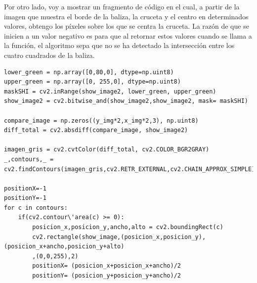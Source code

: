 \hspace{1cm} Por otro lado, voy a mostrar un fragmento de c\'odigo en el cual, a partir de la imagen que muestra el borde de la baliza, la cruceta y el centro en determinados valores, obtengo los p\'ixeles sobre los que se centra la cruceta. La raz\'on de que se inicien a un valor negativo es para que al retornar estos valores cuando se llama a la funci\'on, el algoritmo sepa que no se ha detectado la intersecci\'on entre los cuatro cuadrados de la baliza. 


\begin{verbatim}
lower_green = np.array([0,80,0], dtype=np.uint8) 
upper_green = np.array([0, 255,0], dtype=np.uint8) 
maskSHI = cv2.inRange(show_image2, lower_green, upper_green)
show_image2 = cv2.bitwise_and(show_image2,show_image2, mask= maskSHI)

compare_image = np.zeros((y_img*2,x_img*2,3), np.uint8)
diff_total = cv2.absdiff(compare_image, show_image2)

imagen_gris = cv2.cvtColor(diff_total, cv2.COLOR_BGR2GRAY)
_,contours,_ = cv2.findContours(imagen_gris,cv2.RETR_EXTERNAL,cv2.CHAIN_APPROX_SIMPLE)

positionX=-1
positionY=-1
for c in contours:
    if(cv2.contour\'area(c) >= 0):
        posicion_x,posicion_y,ancho,alto = cv2.boundingRect(c) 
        cv2.rectangle(show_image,(posicion_x,posicion_y),(posicion_x+ancho,posicion_y+alto)
        ,(0,0,255),2)
        positionX= (posicion_x+posicion_x+ancho)/2
        positionY= (posicion_y+posicion_y+ancho)/2
\end{verbatim}

